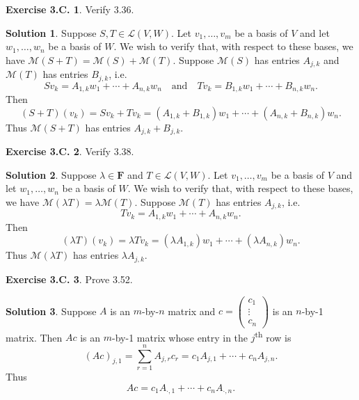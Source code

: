 \documentclass[12pt]{article}
\theoremstyle{definition}
\theoremstyle{exercise}
\newtheorem{exercise}{Exercise 3.C.}
\theoremstyle{solution}
\newtheorem*{solution}{Solution}
\newcommand{\lmap}{\mathcal{L}}
\newcommand{\mat}{\mathcal{M}}
\newcommand{\ts}{\textsuperscript}
\newcommand{\quand}{\quad \text{and} \quad}
\newcommand{\F}{\mathbf{F}}
\begin{document}
\begin{exercise}
\label{ex:7}
    Verify 3.36.
\end{exercise}

\begin{solution}
    Suppose \( S, T \in \lmap(V, W) \). Let \( v_1, \ldots, v_m \) be a basis of \( V \) and let \( w_1, \ldots, w_n \) be a basis of \( W \). We wish to verify that, with respect to these bases, we have \( \mat(S + T) = \mat(S) + \mat(T) \). Suppose \( \mat(S) \) has entries \( A_{j,k} \) and \( \mat(T) \) has entries \( B_{j,k} \), i.e.\
    \[
        Sv_k = A_{1,k} w_1 + \cdots + A_{n,k} w_n \quand Tv_k = B_{1,k} w_1 + \cdots + B_{n,k} w_n.
    \]
    Then
    \[
        (S + T)(v_k) = Sv_k + Tv_k = (A_{1,k} + B_{1,k}) w_1 + \cdots + (A_{n,k} + B_{n,k}) w_n.
    \]
    Thus \( \mat(S + T) \) has entries \( A_{j,k} + B_{j,k} \).
\end{solution}

\begin{exercise}
\label{ex:8}
    Verify 3.38.
\end{exercise}

\begin{solution}
    Suppose \( \lambda \in \F \) and \( T \in \lmap(V, W) \). Let \( v_1, \ldots, v_m \) be a basis of \( V \) and let \( w_1, \ldots, w_n \) be a basis of \( W \). We wish to verify that, with respect to these bases, we have \( \mat(\lambda T) = \lambda \mat(T) \). Suppose \( \mat(T) \) has entries \( A_{j,k} \), i.e.\
    \[
        Tv_k = A_{1,k} w_1 + \cdots + A_{n,k} w_n.
    \]
    Then
    \[
        (\lambda T)(v_k) = \lambda Tv_k = (\lambda A_{1,k}) w_1 + \cdots + (\lambda A_{n,k}) w_n.
    \]
    Thus \( \mat(\lambda T) \) has entries \( \lambda A_{j,k} \).
\end{solution}

\begin{exercise}
\label{ex:9}
    Prove 3.52.
\end{exercise}

\begin{solution}
    Suppose \( A \) is an \(m\)-by-\(n\) matrix and \( c = \begin{pmatrix}
        c_1 \\
        \vdots \\
        c_n
    \end{pmatrix} \) is an \(n\)-by-1 matrix. Then \( Ac \) is an \(m\)-by-1 matrix whose entry in the \(j\)\ts{th} row is
    \[
        (Ac)_{j,1} = \sum_{r=1}^n A_{j,r} c_{r} = c_1 A_{j,1} + \cdots + c_n A_{j,n}.
    \]
    Thus
    \[
        Ac = c_1 A_{\cdot,1} + \cdots + c_n A_{\cdot,n}.
    \]
\end{solution}
\end{document}
